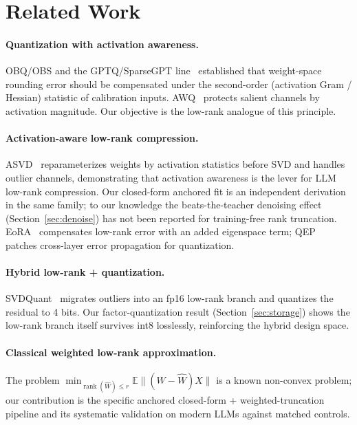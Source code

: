 \documentclass[11pt]{article}
\newcommand{\Wh}{\widehat{W}}
\begin{document}
\section{Related Work}

\paragraph{Quantization with activation awareness.} OBQ/OBS and the
GPTQ/SparseGPT line~\cite{frantar2022gptq,frantar2023sparsegpt} established
that weight-space rounding error should be
compensated under the second-order (activation Gram / Hessian) statistic of
calibration inputs. AWQ~\cite{lin2023awq} protects salient channels by
activation magnitude.
Our objective is the low-rank analogue of this principle.

\paragraph{Activation-aware low-rank compression.} ASVD~\cite{yuan2023asvd}
reparameterizes weights by activation statistics before
SVD and handles outlier channels, demonstrating that activation awareness
is the lever for LLM low-rank compression. Our closed-form anchored fit is
an independent derivation in the same family; to our knowledge the
beats-the-teacher denoising effect (Section~\ref{sec:denoise}) has not been
reported for training-free rank truncation. EoRA~\cite{liu2024eora}
compensates low-rank error with an added eigenspace term;
QEP~\cite{arai2025qep} patches cross-layer error propagation for
quantization.

\paragraph{Hybrid low-rank + quantization.} SVDQuant~\cite{li2024svdquant}
migrates outliers into an fp16 low-rank branch and quantizes the residual
to 4 bits. Our factor-quantization result (Section~\ref{sec:storage}) shows
the low-rank branch itself survives int8 losslessly, reinforcing the hybrid
design space.

\paragraph{Classical weighted low-rank approximation.} The problem
$\min_{\operatorname{rank}(\Wh)\le r} \mathbb{E}\|(W-\Wh)X\|$ is a known
non-convex problem; our contribution is the specific anchored closed-form +
weighted-truncation pipeline and its systematic validation on modern LLMs
against matched controls.
\end{document}

